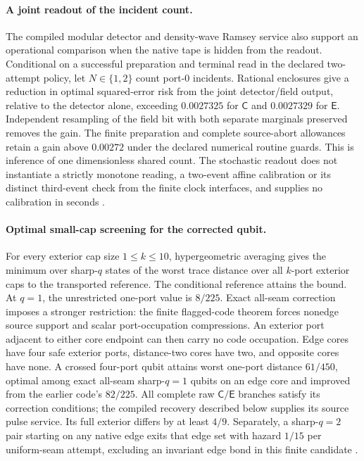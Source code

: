 \documentclass[11pt]{article}
\theoremstyle{definition}
\theoremstyle{remark}
\theoremstyle{plain}
\newcommand{\Cn}{\mathsf{C}}
\newcommand{\En}{\mathsf{E}}
\begin{document}
\paragraph{A joint readout of the incident count.}
The compiled modular detector and density-wave Ramsey service also support
an operational comparison when the native tape is hidden from the readout.
Conditional on a successful preparation and terminal read in the declared
two-attempt policy, let $N\in\{1,2\}$ count port-0 incidents. Rational
enclosures give a reduction in optimal squared-error risk from the joint
detector/field output, relative to the detector alone, exceeding $0.0027325$
for $\Cn$ and $0.0027329$ for $\En$. Independent resampling of the field
bit with both separate marginals preserved removes the gain. The finite
preparation and complete source-abort allowances retain a gain above
$0.00272$ under the declared numerical routine guards. This is inference of
one dimensionless shared count. The stochastic readout does not instantiate
a strictly monotone reading, a two-event affine calibration or its distinct
third-event check from the finite clock interfaces, and supplies no calibration in seconds
\cite{clockCountInference}.

\paragraph{Optimal small-cap screening for the corrected qubit.}
For every exterior cap size $1\le k\le10$, hypergeometric averaging gives
the minimum over sharp-$q$ states of the worst trace distance over all
$k$-port exterior caps to the transported reference. The conditional
reference attains the bound.
At $q=1$, the unrestricted one-port value is $8/225$. Exact all-seam
correction imposes a stronger restriction: the finite flagged-code theorem
forces nonedge source support and scalar port-occupation compressions.
An exterior port adjacent to either core endpoint can then carry no code
occupation. Edge cores have four safe exterior ports, distance-two cores
have two, and opposite cores have none. A crossed four-port qubit attains
worst one-port distance $61/450$, optimal among exact all-seam sharp-$q=1$
qubits on an edge core and improved from the earlier code's $82/225$.
All complete raw $\Cn/\En$ branches satisfy its correction conditions;
the compiled recovery described below supplies its source pulse service. Its full
exterior differs by at least $4/9$. Separately, a sharp-$q=2$ pair
starting on any native edge exits that edge set with hazard $1/15$ per
uniform-seam attempt, excluding an invariant edge bond in this finite
candidate \cite{particleScreening}.
\end{document}
